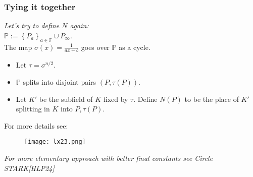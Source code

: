 \documentclass[shadesubsections,compress,14pt,mathserif]{beamer}
\newcommand{\F}{\ensuremath{{\mathbb F}}}
\renewcommand{\P}{\ensuremath{{\mathbb P}}}
\newcommand{\set}[1]{\ensuremath{\left\{#1\right\}}}
\newcommand{\defeq}{\ensuremath{:=}}
\begin{document}
\begin{frame}
\frametitle{Tying it together}
\textit{Let's try to define $N$ again:}\\ 
$\P \defeq \set{P_a}_{a\in \F} \cup P_{\infty}$.\\ \pause
The map $\sigma(x)=\frac{1}{ax+b}$ goes over $\P$ as a cycle.
\begin{itemize}
\item Let $\tau = \sigma^{n/2}$. %
\item $\P$ splits into disjoint pairs $(P,\tau(P))$.\pause
\item  
Let $K'$ be the subfield of $K$ fixed by $\tau$. Define $N(P)$ to be the place of $K'$ splitting in $K$ into $P,\tau(P)$.
\end{itemize}
\end{frame}


\begin{frame}

 For more details see:
 \begin{figure}
  \texttt{[image: lx23.png]}
\end{figure}
 \textit{For more elementary approach with better final constants see Circle STARK[HLP24]}
\end{frame}
\end{document}
